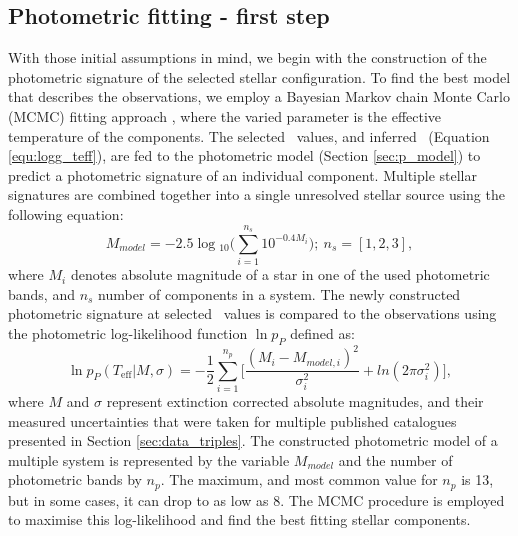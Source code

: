 \subsection{Photometric fitting - first step}
\label{sec:photo_fit}
With those initial assumptions in mind, we begin with the construction of the photometric signature of the selected stellar configuration. To find the best model that describes the observations, we employ a Bayesian Markov chain Monte Carlo (MCMC) fitting approach \cite{2013PASP..125..306F}, where the varied parameter is the effective temperature of the components. The selected \Teff\ values, and inferred \Logg\ (Equation \ref{equ:logg_teff}), are fed to the photometric model (Section \ref{sec:p_model}) to predict a photometric signature of an individual component. Multiple stellar signatures are combined together into a single unresolved stellar source using the following equation:
\begin{equation}
	M_{model} = -2.5 \log{}_{10} \Big( \sum_{i=1}^{n_s} 10^{-0.4 M_i} \Big); \ n_s=[1, 2, 3],
\end{equation}
where $M_i$ denotes absolute magnitude of a star in one of the used photometric bands, and $n_s$ number of components in a system. The newly constructed photometric signature at selected \Teff\ values is compared to the observations using the photometric log-likelihood function $\ln p_{P}$ defined as:
\begin{equation}
	\label{equ:lnp_p}
	\ln p_{P}(T_\mathrm{eff} | M, \sigma) = -\frac{1}{2} \sum_{i=1}^{n_p} \Big[ \frac{(M_i - M_{model, i})^2}{\sigma_i^2} +ln(2\pi\sigma_i^2) \Big],
\end{equation}
where $M$ and $\sigma$ represent extinction corrected absolute magnitudes, and their measured uncertainties that were taken for multiple published catalogues presented in Section \ref{sec:data_triples}. The constructed photometric model of a multiple system is represented by the variable $M_{model}$ and the number of photometric bands by $n_p$. The maximum, and most common value for $n_p$ is 13, but in some cases, it can drop to as low as 8. The MCMC procedure is employed to maximise this log-likelihood and find the best fitting stellar components.

